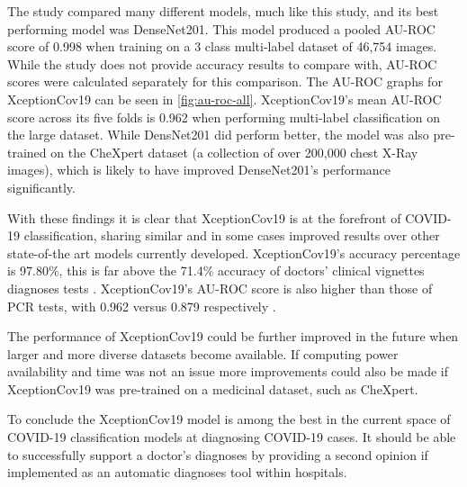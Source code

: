 The \cite{bressem2020comparing} study compared many different models, much like this study, and its best performing model was DenseNet201. This model produced a pooled AU-ROC score of 0.998 when training on a 3 class multi-label dataset of 46,754 images. While the study does not provide accuracy results to compare with, AU-ROC scores were calculated separately for this comparison. The AU-ROC graphs for XceptionCov19 can be seen in \autoref{fig:au-roc-all}. XceptionCov19's mean AU-ROC score across its five folds is 0.962 when performing multi-label classification on the large dataset. While \cite{bressem2020comparing} DensNet201 did perform better, the model was also pre-trained on the CheXpert dataset (a collection of over 200,000 chest X-Ray images), which is likely to have improved DenseNet201's performance significantly.

With these findings it is clear that XceptionCov19 is at the forefront of COVID-19 classification, sharing similar and in some cases improved results over other state-of-the art models currently developed. XceptionCov19's accuracy percentage is 97.80\%, this is far above the 71.4\% accuracy of doctors' clinical vignettes diagnoses tests \citep{richens2020improving}. XceptionCov19's AU-ROC score is also higher than those of PCR tests, with 0.962 versus 0.879 respectively \citep{mardani2020laboratory}.

The performance of XceptionCov19 could be further improved in the future when larger and more diverse datasets become available. If computing power availability and time was not an issue more improvements could also be made if XceptionCov19 was pre-trained on a medicinal dataset, such as CheXpert. 

To conclude the XceptionCov19 model is among the best in the current space of COVID-19 classification models at diagnosing COVID-19 cases. It should be able to successfully support a doctor's diagnoses by providing a second opinion if implemented as an automatic diagnoses tool within hospitals.